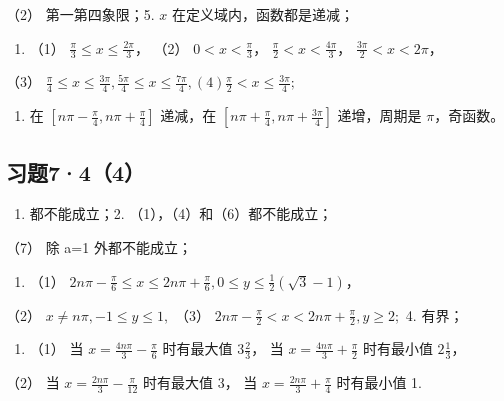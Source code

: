 （2） 第一第四象限；5. \(x\) 在定义域内，函数都是递减；

\begin{enumerate}[start=7]
\item
  （1） \(\frac{\pi}{3} \leqslant x \leqslant \frac{2\pi}{3}\)， （2）
  \(0 < x < \frac{\pi}{3}\)， \(\frac{\pi}{2} < x < \frac{4\pi}{3}\)，
  \(\frac{3\pi}{2} < x < 2\pi\)，
\end{enumerate}

（3）
\(\frac{\pi}{4} \leqslant x \leqslant \frac{3\pi}{4}, \frac{5\pi}{4} \leqslant x \leqslant \frac{7\pi}{4}, (4) \frac{\pi}{2} < x \leqslant \frac{3\pi}{4};\)

\begin{enumerate}[start=8]
\item
  在 \(\left[n\pi - \frac{\pi}{4}, n\pi + \frac{\pi}{4}\right]\)
  递减，在 \(\left[n\pi + \frac{\pi}{4}, n\pi + \frac{3\pi}{4}\right]\)
  递增，周期是 \(\pi\)，奇函数。
\end{enumerate}

\subsection{习题7·4（4）}

\begin{enumerate}
\item
  都不能成立；2. （1），（4）和（6）都不能成立；
\end{enumerate}

（7） 除 a=1 外都不能成立；

\begin{enumerate}[start=3]
\item
  （1）
  \(2n\pi - \frac{\pi}{6} \leqslant x \leqslant 2n\pi + \frac{\pi}{6}, 0 \leqslant y \leqslant \frac{1}{2} (\sqrt{3} - 1)\)，
\end{enumerate}

（2） \(x \neq n\pi, -1 \leqslant y \leqslant 1,\) （3）
\(2n\pi - \frac{\pi}{2} < x < 2n\pi + \frac{\pi}{2}, y \geqslant 2;\) 4.
有界；

\begin{enumerate}[start=5]
\item
  （1） 当 \(x = \frac{4n\pi}{3} - \frac{\pi}{6}\) 时有最大值
  \(3\frac{2}{3}\)， 当 \(x = \frac{4n\pi}{3} + \frac{\pi}{2}\)
  时有最小值 \(2\frac{1}{3}\)，
\end{enumerate}

（2） 当 \(x = \frac{2n\pi}{3} - \frac{\pi}{12}\) 时有最大值 3， 当
\(x = \frac{2n\pi}{3} + \frac{\pi}{4}\) 时有最小值 1.

